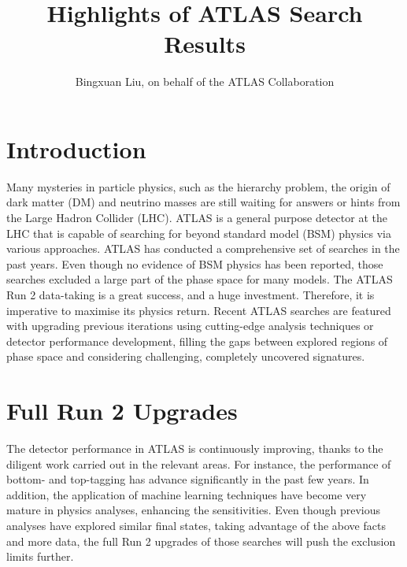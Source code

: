 \documentclass{moriond}
\begin{document}
\title{Highlights of ATLAS Search Results}

\author{Bingxuan Liu, on behalf of the ATLAS Collaboration}

\address{Department of Physics, Simon Fraser University, Vancouver, Canada}

\maketitle{}  

\section{Introduction}

Many mysteries in particle physics, such as the hierarchy problem, the origin
of dark matter (DM) and neutrino masses are still waiting for answers or hints
from the Large Hadron Collider (LHC). ATLAS is a general purpose detector at
the LHC that is capable of searching for beyond standard model (BSM) physics
via various approaches. ATLAS has conducted a comprehensive set of searches in
the past years. Even though no evidence of BSM physics has been reported, those
searches excluded a large part of the phase space for many models. The ATLAS
Run 2 data-taking is a great success, and a huge investment. Therefore, it is
imperative to maximise its physics return. Recent ATLAS searches are featured
with upgrading previous iterations using cutting-edge analysis techniques or
detector performance development, filling the gaps between explored regions of
phase space and considering challenging, completely uncovered signatures.      

\section{Full Run 2 Upgrades}

The detector performance in ATLAS is continuously improving, thanks to the
diligent work carried out in the relevant areas. For instance, the performance
of bottom- and top-tagging has advance significantly in the past few years. In
addition, the application of machine learning techniques have become very
mature in physics analyses, enhancing the sensitivities. Even though previous
analyses have explored similar final states, taking advantage of the above
facts and more data, the full Run 2 upgrades of those searches will push
the exclusion limits further.\\
\end{document}
